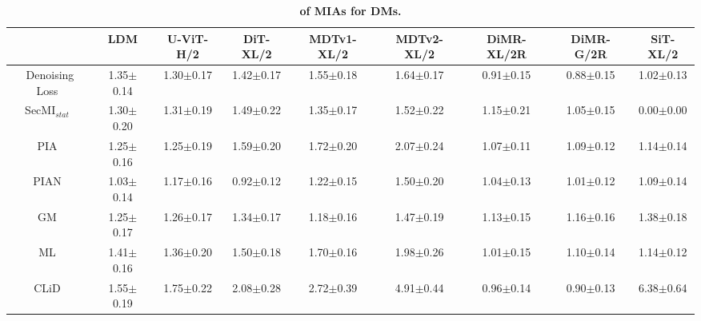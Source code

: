\begin{table}[h!]
    \centering
    \tiny
    \setlength{\tabcolsep}{3pt}
    \caption{\textbf{\tprat of MIAs for DMs.}}
    \begin{tabular}{ccccccccc}
    \toprule
     & LDM & U-ViT-H/2 & DiT-XL/2 & MDTv1-XL/2 & MDTv2-XL/2 & DiMR-XL/2R & DiMR-G/2R & SiT-XL/2 \\
    \midrule
    Denoising Loss~\citep{carlini2023extracting} & 1.35{\tiny $\pm$0.14} & 1.30{\tiny $\pm$0.17} & 1.42{\tiny $\pm$0.17} & 1.55{\tiny $\pm$0.18} & 1.64{\tiny $\pm$0.17} & 0.91{\tiny $\pm$0.15} & 0.88{\tiny $\pm$0.15} & 1.02{\tiny $\pm$0.13} \\
    SecMI$_{stat}$~\citep{dm2_duan23bSecMI} & 1.30{\tiny $\pm$0.20} & 1.31{\tiny $\pm$0.19} & 1.49{\tiny $\pm$0.22} & 1.35{\tiny $\pm$0.17} & 1.52{\tiny $\pm$0.22} & 1.15{\tiny $\pm$0.21} & 1.05{\tiny $\pm$0.15} & 0.00{\tiny $\pm$0.00} \\
    PIA~\citep{kong2023efficient} & 1.25{\tiny $\pm$0.16} & 1.25{\tiny $\pm$0.19} & 1.59{\tiny $\pm$0.20} & 1.72{\tiny $\pm$0.20} & 2.07{\tiny $\pm$0.24} & 1.07{\tiny $\pm$0.11} & 1.09{\tiny $\pm$0.12} & 1.14{\tiny $\pm$0.14} \\
    PIAN~\citep{kong2023efficient} & 1.03{\tiny $\pm$0.14} & 1.17{\tiny $\pm$0.16} & 0.92{\tiny $\pm$0.12} & 1.22{\tiny $\pm$0.15} & 1.50{\tiny $\pm$0.20} & 1.04{\tiny $\pm$0.13} & 1.01{\tiny $\pm$0.12} & 1.09{\tiny $\pm$0.14} \\
    GM~\citep{dubinski2024cdicopyrighteddataidentification} & 1.25{\tiny $\pm$0.17} & 1.26{\tiny $\pm$0.17} & 1.34{\tiny $\pm$0.17} & 1.18{\tiny $\pm$0.16} & 1.47{\tiny $\pm$0.19} & 1.13{\tiny $\pm$0.15} & 1.16{\tiny $\pm$0.16} & 1.38{\tiny $\pm$0.18} \\
    ML~\citep{dubinski2024cdicopyrighteddataidentification} & 1.41{\tiny $\pm$0.16} & 1.36{\tiny $\pm$0.20} & 1.50{\tiny $\pm$0.18} & 1.70{\tiny $\pm$0.16} & 1.98{\tiny $\pm$0.26} & 1.01{\tiny $\pm$0.15} & 1.10{\tiny $\pm$0.14} & 1.14{\tiny $\pm$0.12} \\
    CLiD~\citep{zhai2024clid} & 1.55{\tiny $\pm$0.19} & 1.75{\tiny $\pm$0.22} & 2.08{\tiny $\pm$0.28} & 2.72{\tiny $\pm$0.39} & 4.91{\tiny $\pm$0.44} & 0.96{\tiny $\pm$0.14} & 0.90{\tiny $\pm$0.13} & 6.38{\tiny $\pm$0.64} \\
    \bottomrule
    \end{tabular}
    \label{tab:tpr_dm}
\end{table}




